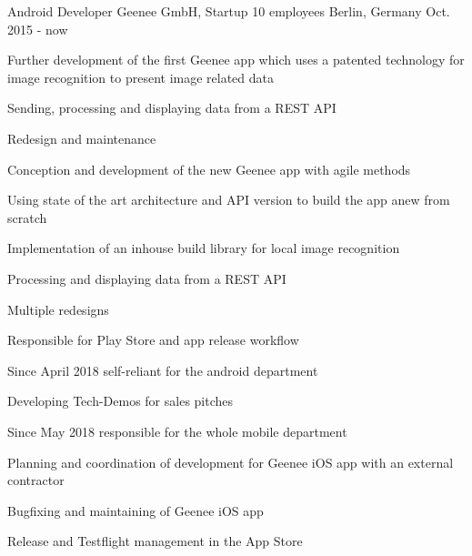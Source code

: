 

\begin{cventries}

  \cventry
    {Android Developer} %
    {Geenee GmbH, Startup 10 employees} %
    {Berlin, Germany} %
    {Oct. 2015 - now} %
    {
      \begin{cvitems} %
        \item {Further development of the first Geenee app which uses a patented technology for image recognition to present image related data}
        \begin{cvsubitems}
          \item {Sending, processing and displaying data from a REST API}
          \item {Redesign and maintenance}
        \end{cvsubitems}
        \item {Conception and development of the new Geenee app with agile methods}
        \begin{cvsubitems}
          \item {Using state of the art architecture and API version to build the app anew from scratch}
          \item {Implementation of an inhouse build library for local image recognition}
          \item {Processing and displaying data from a REST API}
          \item {Multiple redesigns}
          \item {Responsible for Play Store and app release workflow}
          \item {Since April 2018 self-reliant for the android department}
        \end{cvsubitems}
        \item {Developing Tech-Demos for sales pitches}
        \item {Since May 2018 responsible for the whole mobile department}
        \begin{cvsubitems}
        \item {Planning and coordination of development for Geenee iOS app with an external contractor}
        \item {Bugfixing and maintaining of Geenee iOS app}
        \item {Release and Testflight management in the App Store}
        \end{cvsubitems}
      \end{cvitems}
    }


\end{cventries}
